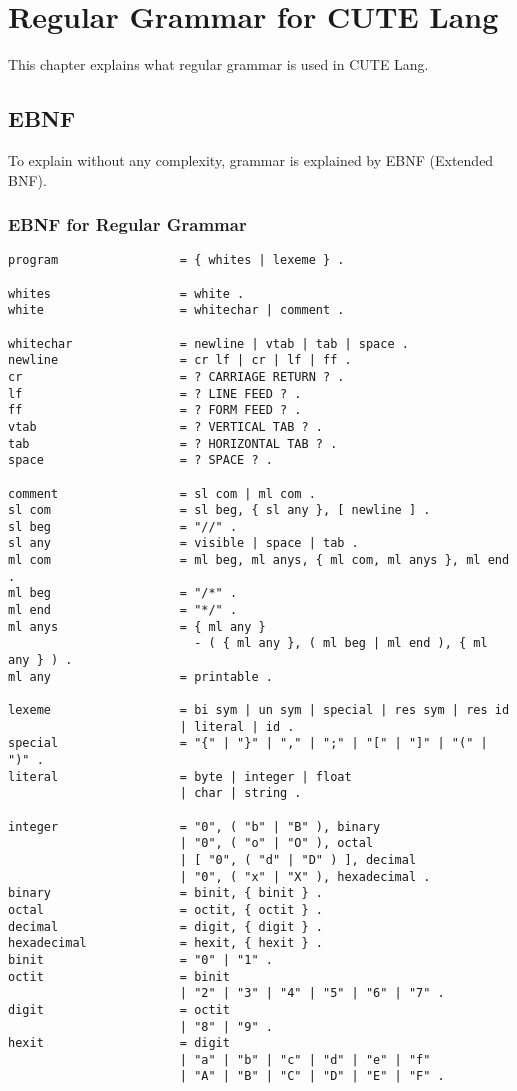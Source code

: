 \documentclass[a4paper, article, oneside, 10pt]{memoir}
\begin{document}
\pagestyle{ruled}
\chapter{Regular Grammar for CUTE Lang}
This chapter explains what regular grammar is used in CUTE Lang.

\section{EBNF}
To explain without any complexity, grammar is explained by EBNF (Extended BNF).

\subsection{EBNF for Regular Grammar}

\begin{verbatim}
program                 = { whites | lexeme } .

whites                  = white .
white                   = whitechar | comment .

whitechar               = newline | vtab | tab | space .
newline                 = cr lf | cr | lf | ff .
cr                      = ? CARRIAGE RETURN ? .
lf                      = ? LINE FEED ? .
ff                      = ? FORM FEED ? .
vtab                    = ? VERTICAL TAB ? .
tab                     = ? HORIZONTAL TAB ? .
space                   = ? SPACE ? .

comment                 = sl com | ml com .
sl com                  = sl beg, { sl any }, [ newline ] .
sl beg                  = "//" .
sl any                  = visible | space | tab .
ml com                  = ml beg, ml anys, { ml com, ml anys }, ml end .
ml beg                  = "/*" .
ml end                  = "*/" .
ml anys                 = { ml any }
                          - ( { ml any }, ( ml beg | ml end ), { ml any } ) .
ml any                  = printable .

lexeme                  = bi sym | un sym | special | res sym | res id
                        | literal | id .
special                 = "{" | "}" | "," | ";" | "[" | "]" | "(" | ")" .
literal                 = byte | integer | float
                        | char | string .

integer                 = "0", ( "b" | "B" ), binary
                        | "0", ( "o" | "O" ), octal
                        | [ "0", ( "d" | "D" ) ], decimal
                        | "0", ( "x" | "X" ), hexadecimal .
binary                  = binit, { binit } .
octal                   = octit, { octit } .
decimal                 = digit, { digit } .
hexadecimal             = hexit, { hexit } .
binit                   = "0" | "1" .
octit                   = binit
                        | "2" | "3" | "4" | "5" | "6" | "7" .
digit                   = octit
                        | "8" | "9" .
hexit                   = digit
                        | "a" | "b" | "c" | "d" | "e" | "f"
                        | "A" | "B" | "C" | "D" | "E" | "F" .


\end{verbatim}
\end{document}
